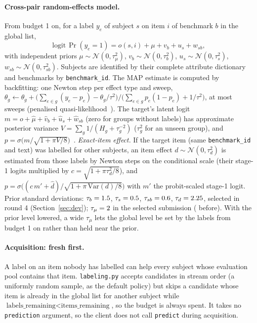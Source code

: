 \documentclass{article}
\begin{document}
\paragraph{Cross-pair random-effects model.} From budget 1 on, for a label $y_e$ of subject $s$ on item $i$ of benchmark $b$ in the global list,
\begin{equation}
\mathrm{logit}\,\Pr(y_e=1) = o(s,i) + \mu + v_b + u_s + w_{sb},
\label{eq:xp}
\end{equation}
with independent priors $\mu\sim\mathcal N(0,\tau_\mu^2)$, $v_b\sim\mathcal N(0,\tau_b^2)$, $u_s\sim\mathcal N(0,\tau_s^2)$, $w_{sb}\sim\mathcal N(0,\tau_{sb}^2)$. Subjects are identified by their complete attribute dictionary and benchmarks by \texttt{benchmark\_id}. The MAP estimate is computed by backfitting: one Newton step per effect type and sweep, $\theta_g \leftarrow \theta_g + \big(\sum_{e\in g}(y_e-p_e)-\theta_g/\tau^2\big)/\big(\sum_{e\in g}p_e(1-p_e)+1/\tau^2\big)$, at most \XpSweeps{} sweeps (penalised quasi-likelihood~\citep{breslow1993}). The target's latent logit $m=o+\hat\mu+\hat v_b+\hat u_s+\hat w_{sb}$ (zero for groups without labels) has approximate posterior variance $V=\sum_g 1/(H_g+\tau_g^{-2})$ ($\tau_g^2$ for an unseen group), and $p=\sigma\big(m/\sqrt{1+\pi V/8}\big)$~\citep{mackay1992}. \emph{Exact-item effect.} If the target item (same \texttt{benchmark\_id} and text) was labelled for other subjects, an item effect $d\sim\mathcal N(0,\tau_d^2)$ is estimated from those labels by \XpItemNewton{} Newton steps on the conditional scale (their stage-1 logits multiplied by $c=\sqrt{1+\pi\tau_d^2/8}$), and $p=\sigma\big((c\,m'+\hat d)/\sqrt{1+\pi\,\mathrm{Var}(d)/8}\big)$ with $m'$ the probit-scaled stage-1 logit. Prior standard deviations: $\tau_b=1.5$, $\tau_s=0.5$, $\tau_{sb}=0.6$, $\tau_d=2.25$, selected in round 4 (Section~\ref{sec:dev}); $\tau_\mu=2$ in the selected submission (\ShipTauMu{} before). With the prior level lowered, a wide $\tau_\mu$ lets the global level be set by the labels from budget 1 on rather than held near the prior.

\paragraph{Acquisition: fresh first.} A label on an item nobody has labelled can help every subject whose evaluation pool contains that item. \texttt{labeling.py} accepts candidates in stream order (a uniformly random sample, as the default policy) but skips a candidate whose item is already in the global list for another subject while $\text{labels\_remaining}<\text{items\_remaining}$, so the budget is always spent. It takes no \texttt{prediction} argument, so the client does not call \texttt{predict} during acquisition.
\end{document}
